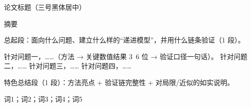 \thispagestyle{plain}

\begin{center}
  {\heiti 论文标题（三号黑体居中）\par}
  \vspace{0.1em}
  {\heiti 摘\quad 要\par}
\end{center}
\vspace{0.08em}
{\linespread{1.20}\selectfont

总起段：面向什么问题、建立什么样的“递进模型”，并用什么链条验证（1 段）。

针对问题一，……（方法 → 关键数值结果 3~6 位 → 验证口径一句话）。
针对问题二，……
针对问题三，……
针对问题四，……

特色总结段（1 段）：方法亮点 + 验证链完整性 + 对局限/近似的如实说明。

\vspace{0.05em}
\quad 词1；词2；词3；词4；词5\par}
\newpage
